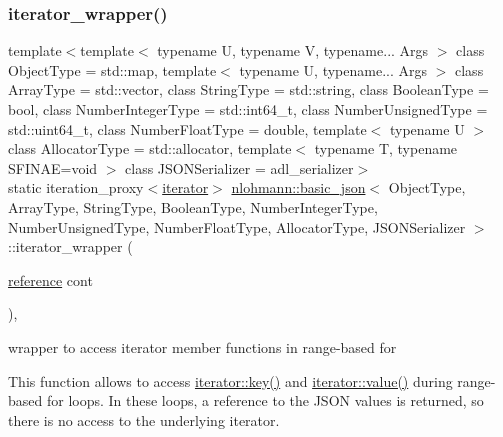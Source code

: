 \subsubsection{\texorpdfstring{iterator\_wrapper()}{iterator\_wrapper()}\hspace{0.1cm}{\footnotesize\ttfamily [1/2]}}
{\footnotesize\ttfamily template$<$template$<$ typename U, typename V, typename... Args $>$ class Object\+Type = std\+::map, template$<$ typename U, typename... Args $>$ class Array\+Type = std\+::vector, class String\+Type  = std\+::string, class Boolean\+Type  = bool, class Number\+Integer\+Type  = std\+::int64\+\_\+t, class Number\+Unsigned\+Type  = std\+::uint64\+\_\+t, class Number\+Float\+Type  = double, template$<$ typename U $>$ class Allocator\+Type = std\+::allocator, template$<$ typename T, typename S\+F\+I\+N\+A\+E=void $>$ class J\+S\+O\+N\+Serializer = adl\+\_\+serializer$>$ \\
static iteration\+\_\+proxy$<$\mbox{\hyperlink{classnlohmann_1_1basic__json_a099316232c76c034030a38faa6e34dca}{iterator}}$>$ \mbox{\hyperlink{classnlohmann_1_1basic__json}{nlohmann\+::basic\+\_\+json}}$<$ Object\+Type, Array\+Type, String\+Type, Boolean\+Type, Number\+Integer\+Type, Number\+Unsigned\+Type, Number\+Float\+Type, Allocator\+Type, J\+S\+O\+N\+Serializer $>$\+::iterator\+\_\+wrapper (\begin{DoxyParamCaption}\item[{\mbox{\hyperlink{classnlohmann_1_1basic__json_ac6a5eddd156c776ac75ff54cfe54a5bc}{reference}}}]{cont }\end{DoxyParamCaption})\hspace{0.3cm}{\ttfamily [inline]}, {\ttfamily [static]}}



wrapper to access iterator member functions in range-\/based for 

This function allows to access \mbox{\hyperlink{classnlohmann_1_1basic__json_1_1iter__impl_a030a45b63b70e12b18ad4f6c1c4f1239}{iterator\+::key()}} and \mbox{\hyperlink{classnlohmann_1_1basic__json_1_1iter__impl_a92e849ca687355935c02f492be936b68}{iterator\+::value()}} during range-\/based for loops. In these loops, a reference to the J\+S\+ON values is returned, so there is no access to the underlying iterator.

